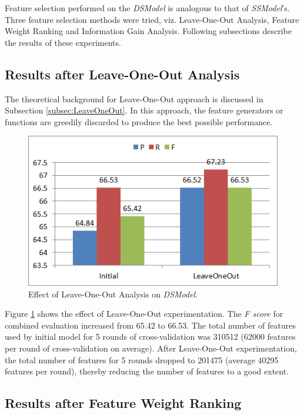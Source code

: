 Feature selection performed on the \textit{DSModel} is analogous to that of \textit{SSModel}'s. Three feature selection methods were tried, viz. Leave-One-Out Analysis, Feature Weight Ranking and Information Gain Analysis. Following subsections describe the results of these experiments.

\subsection{Results after Leave-One-Out Analysis}

The theoretical background for Leave-One-Out approach is discussed in Subsection \ref{subsec:LeaveOneOut}. In this approach, the feature generators or functions are greedily discarded to produce the best possible performance.

\begin{figure}
\centering
\includegraphics[scale=0.8]{figures/DSLeaveOneOutComb.png}
\caption{Effect of Leave-One-Out Analysis on \textit{DSModel}.}\label{fig:DSLeaveOO}
\end{figure}

Figure \ref{fig:DSLeaveOO} shows the effect of Leave-One-Out experimentation. The \textit{F score} for combined evaluation increased from 65.42 to 66.53. The total number of features used by initial model for 5 rounds of cross-validation was 310512 (62000 features per round of cross-validation on average). After Leave-One-Out experimentation, the total number of features for 5 rounds dropped to 201475 (average 40295 features per round), thereby reducing the number of features to a good extent.

\subsection{Results after Feature Weight Ranking}

